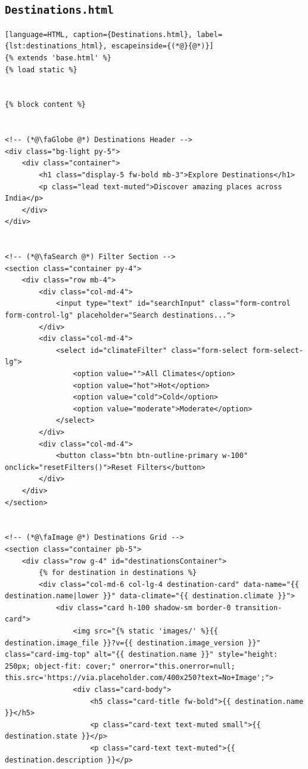 \subsection{\texttt{Destinations.html}}
\begin{lstlisting}[language=HTML, caption={Destinations.html}, label={lst:destinations_html}, escapeinside={(*@}{@*)}]
{% extends 'base.html' %}
{% load static %}


{% block content %}


<!-- (*@\faGlobe @*) Destinations Header -->
<div class="bg-light py-5">
    <div class="container">
        <h1 class="display-5 fw-bold mb-3">Explore Destinations</h1>
        <p class="lead text-muted">Discover amazing places across India</p>
    </div>
</div>


<!-- (*@\faSearch @*) Filter Section -->
<section class="container py-4">
    <div class="row mb-4">
        <div class="col-md-4">
            <input type="text" id="searchInput" class="form-control form-control-lg" placeholder="Search destinations...">
        </div>
        <div class="col-md-4">
            <select id="climateFilter" class="form-select form-select-lg">
                <option value="">All Climates</option>
                <option value="hot">Hot</option>
                <option value="cold">Cold</option>
                <option value="moderate">Moderate</option>
            </select>
        </div>
        <div class="col-md-4">
            <button class="btn btn-outline-primary w-100" onclick="resetFilters()">Reset Filters</button>
        </div>
    </div>
</section>


<!-- (*@\faImage @*) Destinations Grid -->
<section class="container pb-5">
    <div class="row g-4" id="destinationsContainer">
        {% for destination in destinations %}
        <div class="col-md-6 col-lg-4 destination-card" data-name="{{ destination.name|lower }}" data-climate="{{ destination.climate }}">
            <div class="card h-100 shadow-sm border-0 transition-card">
                <img src="{% static 'images/' %}{{ destination.image_file }}?v={{ destination.image_version }}" class="card-img-top" alt="{{ destination.name }}" style="height: 250px; object-fit: cover;" onerror="this.onerror=null; this.src='https://via.placeholder.com/400x250?text=No+Image';">
                <div class="card-body">
                    <h5 class="card-title fw-bold">{{ destination.name }}</h5>
                    <p class="card-text text-muted small">{{ destination.state }}</p>
                    <p class="card-text text-muted">{{ destination.description }}</p>
                    

\end{lstlisting}
